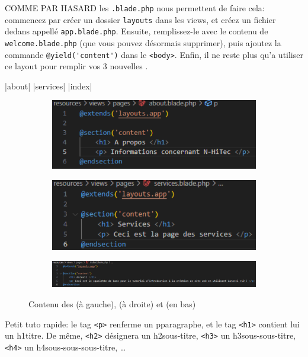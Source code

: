 \documentclass[internal]{nhitec_design}
\begin{document}
COMME PAR HASARD les \views{} \verb|.blade.php| nous permettent de faire cela: commencez par créer un dossier \verb|layouts| dans les views, et créez un fichier dedans appellé \verb|app.blade.php|. Ensuite, remplissez-le avec le contenu de \verb|welcome.blade.php| (que vous pouvez désormais supprimer), puis ajoutez la commande \verb|@yield('content')| dans le \verb|<body>|. Enfin, il ne reste plus qu'a utiliser ce layout pour remplir vos 3 nouvelles \views{}.

\vspace{2cm}
|about|
|services|
|index|
\begin{figure}[!h]
    \centering
    \begin{subfigure}[b]{0.49\textwidth}
         \centering
         \includegraphics[width=\textwidth]{figures-C1/basic_about.pdf}
     \end{subfigure}
     \begin{subfigure}[b]{0.49\textwidth}
         \centering
         \includegraphics[width=\textwidth]{figures-C1/basic_services.pdf}
     \end{subfigure}
     \begin{subfigure}[b]{1\textwidth}
         \centering
         \includegraphics[width=\textwidth]{figures-C1/basic_acceuil.pdf}
     \end{subfigure}
        \caption{Contenu des \views{} \protect{} (à gauche), \protect{} (à droite) et \protect{} (en bas)}
\end{figure}
Petit tuto \html{} rapide: le tag \verb|<p>| renferme un pparagraphe, et le tag \verb|<h1>| contient lui un h1titre. De même, \verb|<h2>| désignera un h2sous-titre, \verb|<h3>| un h3sous-sous-titre, \verb|<h4>| un h4sous-sous-sous-titre, \ldots
\end{document}
